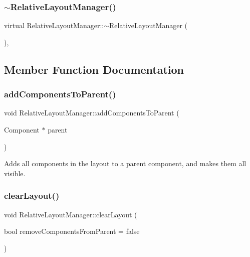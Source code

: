 \subsubsection{\texorpdfstring{$\sim$\+Relative\+Layout\+Manager()}{~RelativeLayoutManager()}}
{\footnotesize\ttfamily virtual Relative\+Layout\+Manager\+::$\sim$\+Relative\+Layout\+Manager (\begin{DoxyParamCaption}{ }\end{DoxyParamCaption})\hspace{0.3cm}{\ttfamily [inline]}, {\ttfamily [virtual]}}



\subsection{Member Function Documentation}
\mbox{\label{classRelativeLayoutManager_acf05615c90a1fe78c721fcbbdd08a027}} 
\subsubsection{\texorpdfstring{add\+Components\+To\+Parent()}{addComponentsToParent()}}
{\footnotesize\ttfamily void Relative\+Layout\+Manager\+::add\+Components\+To\+Parent (\begin{DoxyParamCaption}\item[{Component $\ast$}]{parent }\end{DoxyParamCaption})}

Adds all components in the layout to a parent component, and makes them all visible. \mbox{\label{classRelativeLayoutManager_a1f4ff862ecf36502f83f48e625122ab3}} 
\subsubsection{\texorpdfstring{clear\+Layout()}{clearLayout()}}
{\footnotesize\ttfamily void Relative\+Layout\+Manager\+::clear\+Layout (\begin{DoxyParamCaption}\item[{bool}]{remove\+Components\+From\+Parent = {\ttfamily false} }\end{DoxyParamCaption})}


